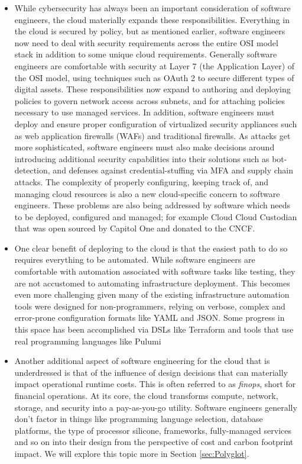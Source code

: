 \documentclass[conference]{IEEEtran}
\begin{document}
\begin{itemize}
	\item  While cybersecurity has always been an important consideration of software engineers, the cloud materially expands these responsibilities. Everything in the cloud is secured by policy, but as mentioned earlier, software engineers now need to deal with security requirements across the entire OSI model\cite{OSIModel} stack in addition to some unique cloud requirements. Generally software engineers are comfortable with security at Layer 7 (the Application Layer) of the OSI model, using techniques such as OAuth 2\cite{oAuthStandard} to secure different types of digital assets. These responsibilities now expand to authoring and deploying policies to govern network access across subnets, and for attaching policies necessary to use managed services.  In addition, software engineers must deploy and ensure proper configuration of virtualized security appliances such as web application firewalls (WAFs) and traditional  firewalls. As attacks get more sophisticated, software engineers must also make decisions around introducing additional security capabilities into their solutions such as bot-detection, and defenses against credential-stuffing via MFA and supply chain attacks.  The complexity of properly configuring, keeping track of, and managing cloud resources is also a new cloud-specific concern to software engineers.  These problems are also being addressed by software which needs to be deployed, configured and managed; for example Cloud Cloud Custodian\cite{CloudCustodian} that was open sourced by Capitol One and donated to the CNCF. 
	
	\item  One clear benefit of deploying to the cloud is that the easiest path to do so requires everything to be automated. While software engineers are comfortable with automation associated with software tasks like testing, they are not accustomed to automating infrastructure deployment. This becomes even more challenging given many of the existing infrastructure automation tools were designed for non-programmers, relying on verbose, complex and error-prone configuration formats like YAML and JSON. Some progress in this space has been accomplished via DSLs like Terraform\cite{terraform} and tools that use real programming languages like Pulumi\cite{Pulumi} 
	
	\item  Another additional aspect of software engineering for the cloud that is underdressed is that of the influence of design decisions that can materially impact operational runtime costs. This is often referred to as \textit{finops}, short for financial operations. At its core, the cloud transforms compute, network, storage, and security into a pay-as-you-go utility.  Software engineers generally don't factor in things like programming language selection, database platforms, the type of processor silicone, frameworks, fully-managed services and so on into their design from the perspective of cost and carbon footprint impact.  We will explore this topic more in Section \ref{sec:Polyglot}.
	
\end{itemize}
\end{document}
